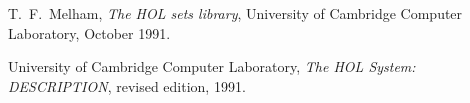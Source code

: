 \begin{thebibliography}{9}

T.\ F.\ Melham,
{\it The HOL sets library},
University of Cambridge Computer Laboratory,
October 1991.

University of Cambridge Computer Laboratory,
{\it The HOL System: DESCRIPTION}, revised edition, 1991.

\end{thebibliography}


